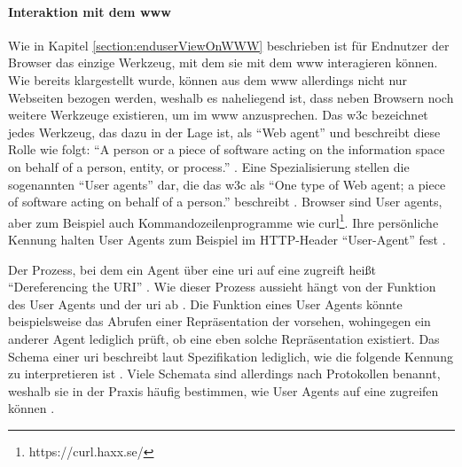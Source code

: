             \paragraph*{Interaktion mit dem \gls{www}}
            Wie in Kapitel \ref{section:enduserViewOnWWW} beschrieben ist für Endnutzer
            der Browser das einzige Werkzeug, mit dem sie mit dem \gls{www}
            interagieren können. Wie bereits klargestellt wurde,
            können aus dem \gls{www} allerdings nicht nur Webseiten bezogen werden,
            weshalb es naheliegend ist, dass neben Browsern noch weitere Werkzeuge existieren,
            um {\resources} im \gls{www} anzusprechen.
            Das \gls{w3c} bezeichnet jedes Werkzeug, das dazu in der Lage ist, als
            "`Web agent"' und beschreibt diese Rolle wie folgt:
            "`A person or a piece of software acting on the information
            space on behalf of a person, entity, or process."' \cite[Kapitel 6]{w3c:wwwArch}.
            Eine Spezialisierung stellen die sogenannten "`User agents"' dar,
            die das \gls{w3c} als "`One type of Web agent;
            a piece of software acting on behalf of a person."' beschreibt \cite[Kapitel 6]{w3c:wwwArch}.
            Browser sind User agents, aber zum Beispiel auch Kommandozeilenprogramme
            wie curl\footnote{https://curl.haxx.se/}.
            Ihre persönliche Kennung halten User Agents zum Beispiel im
            HTTP-Header "`User-Agent"' fest \cite[Kapitel 5.5.3, Seite 46]{rfc:7231}.

            Der Prozess, bei dem ein Agent über eine \gls{uri} auf eine {\resource}
            zugreift heißt "`Dereferencing the URI"' \cite[Kapitel 3.1]{w3c:wwwArch}.
            Wie dieser Prozess aussieht hängt von der Funktion des User Agents und der \gls{uri} ab
            \cite[Kapitel 3.1]{w3c:wwwArch}.
            Die Funktion eines User Agents könnte beispielsweise das Abrufen einer
            Repräsentation der {\resource} vorsehen, wohingegen ein anderer Agent
            lediglich prüft, ob eine eben solche Repräsentation existiert.
            Das Schema einer \gls{uri} beschreibt laut Spezifikation
            lediglich, wie die folgende Kennung zu interpretieren ist
            \cite[Kapitel 3.1, Seite 17]{rfc:3986}.
            Viele Schemata sind allerdings nach Protokollen benannt,
            weshalb sie in der Praxis häufig bestimmen,
            wie User Agents auf eine {\resource} zugreifen können
            \cite[Kapitel 3.1]{w3c:wwwArch}.
            
